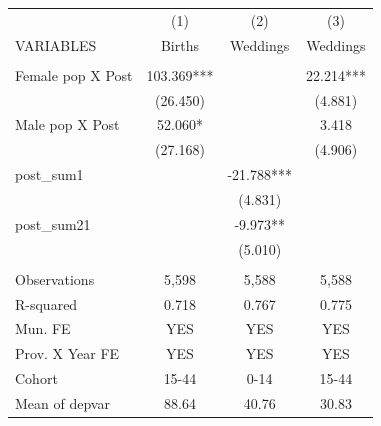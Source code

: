 \begin{tabular}{lccc} \hline
 & (1) & (2) & (3) \\
VARIABLES & Births & Weddings & Weddings \\ \hline
 &  &  &  \\
Female pop X Post & 103.369*** &  & 22.214*** \\
 & (26.450) &  & (4.881) \\
Male pop X Post & 52.060* &  & 3.418 \\
 & (27.168) &  & (4.906) \\
post\_sum1 &  & -21.788*** &  \\
 &  & (4.831) &  \\
post\_sum21 &  & -9.973** &  \\
 &  & (5.010) &  \\
 &  &  &  \\
Observations & 5,598 & 5,588 & 5,588 \\
R-squared & 0.718 & 0.767 & 0.775 \\
Mun. FE & YES & YES & YES \\
Prov. X Year FE & YES & YES & YES \\
Cohort & 15-44 & 0-14 & 15-44 \\
 Mean of depvar & 88.64 & 40.76 & 30.83 \\ \hline
\end{tabular}
